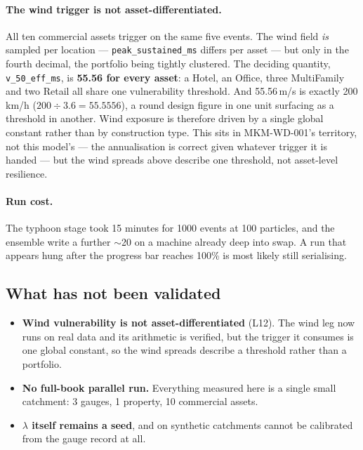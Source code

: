 \documentclass[11pt]{article}
\begin{document}
\paragraph{The wind trigger is not asset-differentiated.}
All ten commercial assets trigger on the same five events. The wind field
\emph{is} sampled per location --- \texttt{peak\_sustained\_ms} differs per
asset --- but only in the fourth decimal, the portfolio being tightly
clustered. The deciding quantity, \texttt{v\_50\_eff\_ms}, is \textbf{55.56 for
every asset}: a Hotel, an Office, three MultiFamily and two Retail all share one
vulnerability threshold. And 55.56\,m/s is exactly 200\,km/h
($200 \div 3.6 = 55.5556$), a round design figure in one unit surfacing as a
threshold in another. Wind exposure is therefore driven by a single global
constant rather than by construction type. This sits in MKM-WD-001's territory,
not this model's --- the annualisation is correct given whatever trigger it is
handed --- but the wind spreads above describe one threshold, not asset-level
resilience.

\paragraph{Run cost.}
The typhoon stage took 15 minutes for 1000 events at 100 particles, and the
ensemble write a further $\sim$20 on a machine already deep into swap. A run
that appears hung after the progress bar reaches 100\% is most likely still
serialising.

\subsection{What has not been validated}
\label{sec:notvalidated}

\begin{itemize}[nosep]
  \item \textbf{Wind vulnerability is not asset-differentiated} (L12). The wind
        leg now runs on real data and its arithmetic is verified, but the
        trigger it consumes is one global constant, so the wind spreads describe
        a threshold rather than a portfolio.
  \item \textbf{No full-book parallel run.} Everything measured here is a single
        small catchment: 3 gauges, 1 property, 10 commercial assets.
  \item \textbf{$\lambda$ itself remains a seed}, and on synthetic catchments
        cannot be calibrated from the gauge record at all.
\end{itemize}
\end{document}
